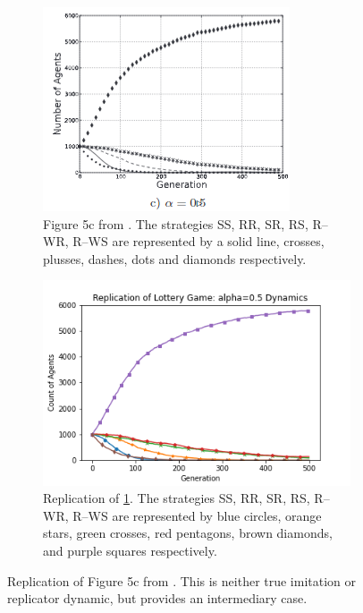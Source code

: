 \FloatBarrier 
\begin{figure}[!h]
  \begin{subfigure}[b]{0.45\textwidth}
    \includegraphics[width=\textwidth]{images/lottery3.png}
    \caption{Figure 5c from \cite{RN30}. The strategies SS, RR, SR, RS, R--WR, R--WS are represented by a solid line, crosses, plusses, dashes, dots and diamonds respectively. }
    \label{lottery3}
  \end{subfigure}
  \hfill
  \begin{subfigure}[b]{0.45\textwidth}
    \includegraphics[width=1.25\textwidth]{images/lottery3_me.png}
    \caption{Replication of \ref{lottery3}. The strategies SS, RR, SR, RS, R--WR, R--WS are represented by blue circles, orange stars, green crosses, red pentagons, brown diamonds, and purple squares respectively. }
    \label{lottery3_me}
  \end{subfigure}
  \caption{Replication of Figure 5c from \cite{RN30}. This is neither true imitation or replicator dynamic, but provides an intermediary case.} \label{lottery_comp2}
\end{figure} 
\FloatBarrier


